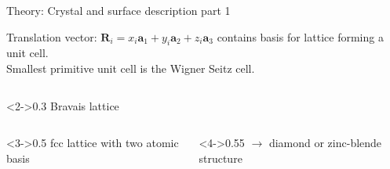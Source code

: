 \begin{frame}{Theory: Crystal and surface description part 1}

	\begin{block}{Translation vector: $\boldsymbol{R}_i = x_i \boldsymbol{a}_1 + y_i \boldsymbol{a}_2 + z_i \boldsymbol{a}_3$}
		contains basis for lattice forming a unit cell. \\
		Smallest primitive unit cell is the Wigner Seitz cell.
	\end{block}
	\begin{columns}
		\begin{column}<2->{0.3\linewidth}
			Bravais lattice  
		\end{column}
	\end{columns}
	\begin{columns}
		\begin{column}<3->{0.5\linewidth}
			fcc lattice with two atomic basis 
		\end{column}
		\hspace{-1cm}
		\begin{column}<4->{0.55\linewidth}
			$\rightarrow$ diamond or zinc-blende structure 
		\end{column}
	\end{columns}

\end{frame}
